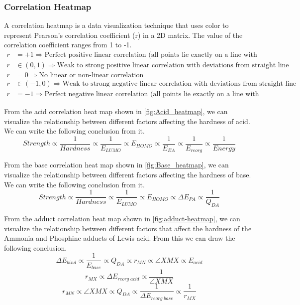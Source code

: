 \subsubsection{Correlation Heatmap}
A correlation heatmap is a data visualization technique that uses color to represent Pearson's correlation coefficient (r) in a 2D matrix. The value of the correlation coefficient ranges from 1 to -1.
\begin{align*}
r &= +1 \Rightarrow \text{Perfect positive linear correlation (all points lie exactly on a line with positive slope)} \\
r &\in (0, 1) \Rightarrow \text{Weak to strong positive linear correlation with deviations from straight line} \\
r &= 0 \Rightarrow \text{No linear or non-linear correlation} \\
r &\in (-1, 0) \Rightarrow \text{Weak to strong negative linear correlation with deviations from straight line} \\
r &= -1 \Rightarrow \text{Perfect negative linear correlation (all points lie exactly on a line with negative slope)}
\end{align*}


From the acid correlation heat map shown in \cref{fig:Acid_heatmap}, we can visualize the relationship between different factors affecting the hardness of acid. We can write the following conclusion from it.
\[
Strength \propto \frac{1}{Hardness} \propto \frac{1}{E_{LUMO}} \propto E_{HOMO}  \propto \frac{1}{E_{EA}} \propto \frac{1}{E_{reorg}} \propto \frac{1}{Energy}
\]

From the base correlation heat map shown in \cref{fig:Base_heatmap}, we can visualize the relationship between different factors affecting the hardness of base. We can write the following conclusion from it.
\[
Strength \propto \frac{1}{Hardness} \propto \frac{1}{E_{LUMO}} \propto E_{HOMO} \propto \Delta E_{PA}  \propto \frac{1}{Q_{DA}}
\]

\newpage
From the adduct correlation heat map shown in \cref{fig:adduct-heatmap}, we can visualize the relationship between different factors that affect the hardness of the Ammonia and Phosphine adducts of Lewis acid. From this we can draw the following conclusion.
\[
\Delta E_{bind} \propto \frac{1}{E_{base}} \propto Q_{DA} \propto r_{MN} \propto \angle XMX \propto E_{acid}
\]
\[
r_{MX} \propto \Delta E_{reorg \; acid} \propto \frac{1}{\angle XMX}
\]
\[
r_{MN} \propto \angle XMX \propto Q_{DA} \propto \frac{1}{\Delta E_{reorg \; base}} \propto \frac{1}{r_{MX}}
\]


